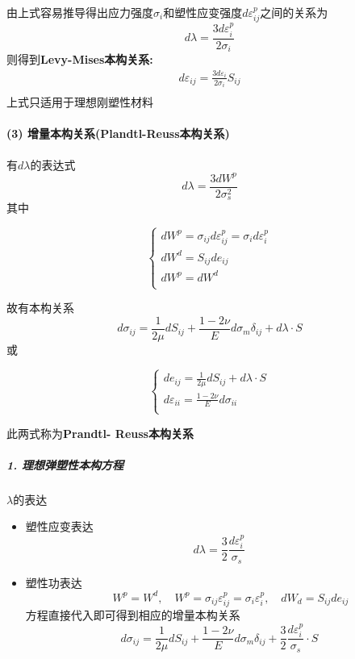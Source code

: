 \documentclass[UTF8]{ctexart}
\providecommand{\tightlist}{%
  \setlength{\itemsep}{0pt}\setlength{\parskip}{0pt}}
\begin{document}
由上式容易推导得出应力强度{\(\sigma_{i}\)}和塑性应变强度{\(d\varepsilon_{ij}^{p}\)}之间的关系为\\
{\[d\lambda = \frac{3d\varepsilon_{i}^{p}}{2\sigma_{i}}\]}则得到\textbf{Levy-Mises本构关系:}\\
{\[\begin{matrix}
\boxed{d\varepsilon_{ij} = \frac{3d\varepsilon_{i}}{2\sigma_{i}}S_{ij}} \\
\end{matrix}\]}上式只适用于理想刚塑性材料

\hypertarget{ux589eux91cfux672cux6784ux5173ux7cfbplandtl-reussux672cux6784ux5173ux7cfb}{%
\paragraph{(3)
增量本构关系(Plandtl-Reuss本构关系)}\label{ux589eux91cfux672cux6784ux5173ux7cfbplandtl-reussux672cux6784ux5173ux7cfb}}

有{\(d\lambda\)}的表达式\\
{\[\boxed{d\lambda = \frac{3dW^{p}}{2\sigma_{s}^{2}}}\]}其中

\[\left\{ \begin{matrix}
{dW^{p} = \sigma_{ij}d\varepsilon_{ij}^{p} = \sigma_{i}d\varepsilon_{i}^{p}} \\
{dW^{d} = S_{ij}de_{ij}} \\
{dW^{p} = dW^{d}} \\
\end{matrix} \right.\]

故有本构关系\\
{\[\boxed{d\sigma_{ij} = \frac{1}{2\mu}dS_{ij} + \frac{1 - 2\nu}{E}d\sigma_{m}\delta_{ij} + d\lambda \cdot S}\]}或

\[\boxed{\left\{ \begin{matrix}
{de_{ij} = \frac{1}{2\mu}dS_{ij} + d\lambda \cdot S} \\
{d\varepsilon_{ii} = \frac{1 - 2\nu}{E}d\sigma_{ii}} \\
\end{matrix} \right.}\]

此两式称为\textbf{Prandtl- Reuss本构关系}

\hypertarget{ux7406ux60f3ux5f39ux5851ux6027ux672cux6784ux65b9ux7a0b}{%
\subparagraph{1.
理想弹塑性本构方程}\label{ux7406ux60f3ux5f39ux5851ux6027ux672cux6784ux65b9ux7a0b}}

{\(\lambda\)}的表达

\begin{itemize}
\tightlist
\item
  塑性应变表达\\
  {\[d\lambda = \frac{3}{2}\frac{d\varepsilon_{i}^{p}}{\sigma_{s}}\]}
\item
  塑性功表达\\
  {\[\qquad W^{p} = W^{d},\quad W^{p} = \sigma_{ij}\varepsilon_{ij}^{p} = \sigma_{i}\varepsilon_{i}^{p},\quad dW_{d} = S_{ij}de_{ij}\]}方程直接代入即可得到相应的增量本构关系\\
  {\[d\sigma_{ij} = \frac{1}{2\mu}dS_{ij} + \frac{1 - 2\nu}{E}d\sigma_{m}\delta_{ij} + \frac{3}{2}\frac{d\varepsilon_{i}^{p}}{\sigma_{s}} \cdot S\]}
\end{itemize}
\end{document}
